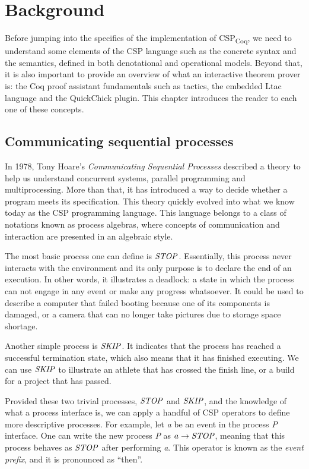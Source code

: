 \chapter{Background}

Before jumping into the specifics of the implementation of CSP\textsubscript{Coq}, we need to understand some elements of the CSP language such as the concrete syntax and the semantics, defined in both denotational and operational models. Beyond that, it is also important to provide an overview of what an interactive theorem prover is: the Coq proof assistant fundamentals such as tactics, the embedded Ltac language and the QuickChick plugin. This chapter introduces the reader to each one of these concepts.

\section{Communicating sequential processes}

In 1978, Tony Hoare's \emph{Communicating Sequential Processes} described a theory to help us understand concurrent systems, parallel programming and multiprocessing. More than that, it has introduced a way to decide whether a program meets its specification. This theory quickly evolved into what we know today as the CSP programming language. This language belongs to a class of notations known as process algebras, where concepts of communication and interaction are presented in an algebraic style.


The most basic process one can define is $ \mathit{\mathord{{STOP}}} $. Essentially, this process never interacts with the environment and its only purpose is to declare the end of an execution. In other words, it illustrates a deadlock: a state in which the process can not engage in any event or make any progress whatsoever. It could be used to describe a computer that failed booting because one of its components is damaged, or a camera that can no longer take pictures due to storage space shortage.

Another simple process is $ \mathit{\mathord{{SKIP}}} $. It indicates that the process has reached a successful termination state, which also means that it has finished executing. We can use $ \mathit{\mathord{{SKIP}}} $ to illustrate an athlete that has crossed the finish line, or a build for a project that has passed.

Provided these two trivial processes, $ \mathit{\mathord{{STOP}}} $ and $ \mathit{\mathord{{SKIP}}} $, and the knowledge of what a process interface is, we can apply a handful of CSP operators to define more descriptive processes. For example, let \emph{a} be an event in the process \emph{P} interface. One can write the new process \emph{P} as $ a \mathrel{\rightarrow} \mathit{\mathord{{STOP}}} $, meaning that this process behaves as $ \mathit{\mathord{{STOP}}} $ after performing \emph{a}. This operator is known as the \emph{event prefix}, and it is pronounced as ``then''.

